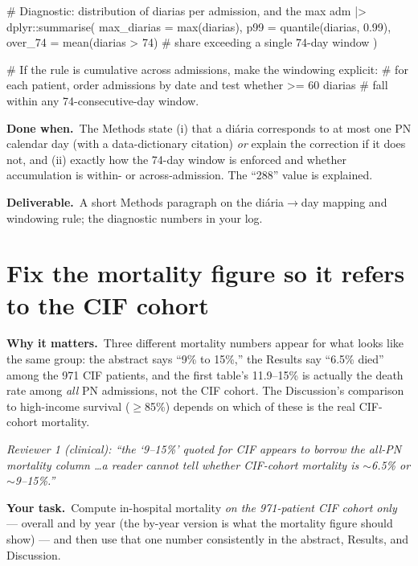\documentclass[11pt,a4paper]{article}
\newenvironment{reviewer}%
  {\def\FrameCommand{{\color{rulegray}\vrule width 1.5pt}\hspace{6pt}%
     \colorbox{quotebg}}%
   \MakeFramed{\advance\hsize-\width \FrameRestore}\small\itshape}%
  {\endMakeFramed}
\newcommand{\why}{\textbf{Why it matters.}\ }
\newcommand{\task}{\textbf{Your task.}\ }
\newcommand{\done}{\textbf{Done when.}\ }
\newcommand{\out}{\textbf{Deliverable.}\ }
\begin{document}
\begin{Rcode}
# Diagnostic: distribution of diarias per admission, and the max
adm |>
  dplyr::summarise(
    max_diarias      = max(diarias),
    p99              = quantile(diarias, 0.99),
    over_74          = mean(diarias > 74)   # share exceeding a single 74-day window
  )

# If the rule is cumulative across admissions, make the windowing explicit:
# for each patient, order admissions by date and test whether >= 60 diarias
# fall within any 74-consecutive-day window.
\end{Rcode}

\done The Methods state (i) that a di\'{a}ria corresponds to at most one PN calendar day (with a
data-dictionary citation) \emph{or} explain the correction if it does not, and (ii) exactly how
the 74-day window is enforced and whether accumulation is within- or across-admission. The
``288'' value is explained.

\out A short Methods paragraph on the di\'{a}ria$\to$day mapping and windowing rule; the
diagnostic numbers in your log.

\section{Fix the mortality figure so it refers to the CIF cohort}

\why Three different mortality numbers appear for what looks like the same group: the abstract
says ``9\% to 15\%,'' the Results say ``6.5\% died'' among the 971 CIF patients, and the first
table's 11.9--15\% is actually the death rate among \emph{all} PN admissions, not the CIF
cohort. The Discussion's comparison to high-income survival ($\geq$85\%) depends on which of
these is the real CIF-cohort mortality.

\begin{reviewer}
Reviewer 1 (clinical): ``the `9--15\%' quoted for CIF appears to borrow the all-PN mortality
column \ldots a reader cannot tell whether CIF-cohort mortality is $\sim$6.5\% or $\sim$9--15\%.''
\end{reviewer}

\task Compute in-hospital mortality \emph{on the 971-patient CIF cohort only} --- overall and by
year (the by-year version is what the mortality figure should show) --- and then use that one
number consistently in the abstract, Results, and Discussion.
\end{document}
